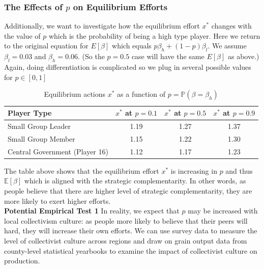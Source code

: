 \documentclass[12pt]{article}
\begin{document}
\subsubsection*{The Effects of $p$ on Equilibrium Efforts}
Additionally, we want to investigate how the equilibrium effort \( x^* \) changes with the value of \( p \) which is the probability of being a high type player. Here we return to the original equation for $E[\beta]$ which equals $p\beta_h+(1-p)\beta_l$. We assume $\beta_l=0.03$ and $\beta_h=0.06$. (So the $p=0.5$ case will have the same $E[\beta]$ as above.)  Again, doing differentiation is complicated so we plug in several possible values for $p \in [0,1]$\\
\begin{table}[H]
  \centering
  \begin{tabular}{lccc}
  \toprule
  \textbf{Player Type} & \textbf{\( x^* \) at \( p = 0.1 \)} & \textbf{\( x^* \) at \( p = 0.5 \)} & \textbf{\( x^* \) at \( p = 0.9 \)} \\
  \midrule
  Small Group Leader        & 1.19 & 1.27 & 1.37 \\
  Small Group Member        & 1.15 & 1.22 & 1.30 \\
  Central Government (Player 16) & 1.12 & 1.17 & 1.23 \\
  \bottomrule
  \end{tabular}
  \caption{Equilibrium actions \( x^* \) as a function of \( p = \mathbb{P}(\beta = \beta_h) \)}
  \label{tab:xstar-vs-p}
  \end{table}
The table above shows that the equilibrium effort \( x^* \) is increasing in \( p \) and thus $\mathbb{E}[\beta]$ which is aligned with the strategic complementarity. In other words, as people believe that there are higher level of strategic complementarity, they are more likely to exert higher efforts.\\ \textbf{Potential Empirical Test 1} In reality, we expect that $p$ may be increased with local collectivism culture: as people more likely to believe that their peers will hard, they will increase their own efforts. We can use survey data to measure the level of collectivist culture across regions and draw on grain output data from county-level statistical yearbooks to examine the impact of collectivist culture on production.\\
\end{document}
